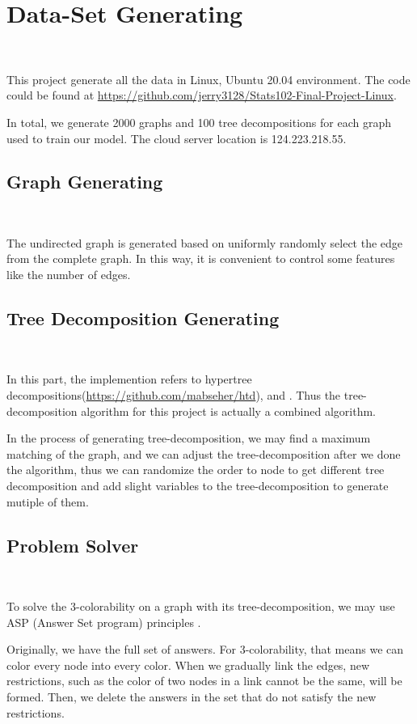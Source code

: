 \section{Data-Set Generating}~\label{sec.DataGen}

This project generate all the data in Linux, Ubuntu 20.04 environment. The code could be found at \url{https://github.com/jerry3128/Stats102-Final-Project-Linux}.

In total, we generate 2000 graphs and 100 tree decompositions for each graph used to train our model. The cloud server location is 124.223.218.55.

\subsection{Graph Generating}~\label{sec.DataGen1}

The undirected graph is generated based on uniformly randomly select the edge from the complete graph. In this way, it is convenient to control some features like the number of edges.

\subsection{Tree Decomposition Generating}~\label{sec.DataGen2}

In this part, the implemention refers to hypertree decompositions(\url{https://github.com/mabseher/htd}), and \cite{BHL1996LinearTreeDeomposition}. Thus the tree-decomposition algorithm for this project is actually a combined algorithm.

In the process of generating tree-decomposition, we may find a maximum matching of the graph, and we can adjust the tree-decomposition after we done the algorithm, thus we can randomize the order to node to get different tree decomposition and add slight variables to the tree-decomposition to generate mutiple of them.

\subsection{Problem Solver}~\label{sec.DataGen3}

To solve the 3-colorability on a graph with its tree-decomposition, we may use ASP (Answer Set program) principles \cite{ASP2008}.

Originally, we have the full set of answers. For 3-colorability, that means we can color every node into every color. When we gradually link the edges, new restrictions, such as the color of two nodes in a link cannot be the same, will be formed. Then, we delete the answers in the set that do not satisfy the new restrictions.


